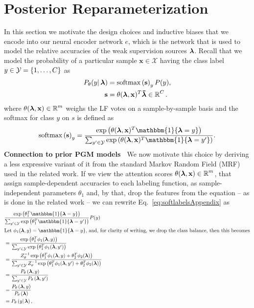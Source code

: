 \documentclass{article}
\newcommand{\softmax}{\mathrm{softmax}}
\newcommand{\indicator}[1]{\mathbbm{1}\{ #1 \}}
\newcommand{\features}{\mathbf{x}}
\newcommand{\lambdaOnehot}{\accentset{\rule{.4em}{.8pt}}{\lfs}}
\begin{document}
\section{Posterior Reparameterization}
\label{sec:appendixReparam}
In this section we motivate the design choices and inductive biases that we encode into our neural encoder network $e$, which is the network that is used to model the relative accuracies of the weak supervision sources $\operatorname{\bm{\lambda}}$. 
Recall that we model the probability of a particular sample $\features \in \mathcal{X}$ having the class label $y \in \operatorname{\mathcal{Y}} = \{1, \dots, C\}$ as
\begin{align}
    P_\theta(y | \lfs) 
    &= \softmax \brackets{ \mathbf{s} }_y P(y),
    \label{eq:softlabelsAppendix} \\
    \mathbf{s}
    &= \theta(\lfs,  \features)^T \lambdaOnehot \in \R^C.
\end{align}
where $\theta(\operatorname{\bm{\lambda}},  \mathbf{x}) \in \operatorname{\mathbb{R}}^m$ weighs the LF votes on a sample-by-sample basis and the softmax for class $y$ on $s$ is defined as
\begin{equation*}
    \softmax \brackets{ \mathbf{s} }_y
    =
    \frac
    {\exp\brackets{\theta(\lfs,  \features)^T\indicator{\lfs = y}}}
    {\sum_{y' \in \Y}\exp\brackets{\theta(\lfs,  \features)^T\indicator{\lfs = y'}}}.
\end{equation*}
\textbf{Connection to prior PGM models} $\;$
We now motivate this choice by deriving a less expressive variant of it from the standard Markov Random Field (MRF) used in the related work.
If we view the attention scores $\theta(\lfs,  \features) \in \R^m$, that assign sample-dependent accuracies to each labeling function, as sample-independent parameters $\theta_1$ and, by that, drop the features from the equation -- as is done in the related work \cite{DP, Multitask, triplets, TripletsMean} -- we can rewrite Eq.~\ref{eq:softlabelsAppendix} as 
\begin{align*}
    &     
    \frac
    {\exp\brackets{\theta_1^T\indicator{\lfs = y}}}
    {\sum_{y' \in \Y}\exp\brackets{\theta_1^T\indicator{\lfs = y'}}} P(y) \\
\intertext{Let $\phi_1(\lfs, y) = \indicator{\lfs = y}$, and, for clarity of writing, we drop the class balance, then this becomes}
    &= 
    \frac
    {\exp\brackets{\theta_1^T\phi_1(\lfs, y)}}
    {\sum_{y' \in \Y}\exp\brackets{\theta_1^T\phi_1(\lfs, y')}} \\
    &= 
    \frac
    {Z_\theta^{-1}\exp\brackets{\theta_1^T\phi_1(\lfs, y) + \theta_2^T\phi_2(\lfs)}}
    {\sum_{y' \in \Y}Z_\theta^{-1}\exp\brackets{\theta_1^T\phi_1(\lfs, y') + \theta_2^T\phi_2(\lfs)}} \\
    &=
    \frac
    {P_\theta \brackets{\lfs, y}}
    {\sum_{y' \in \Y} P_\theta \brackets{\lfs, y'}} \\
    &= 
    \frac
    {P_\theta \brackets{\lfs, y}}
    {P_\theta \brackets{\lfs}} \\
    &= 
    P_\theta \brackets{y | \lfs},
\end{align*}
\end{document}
